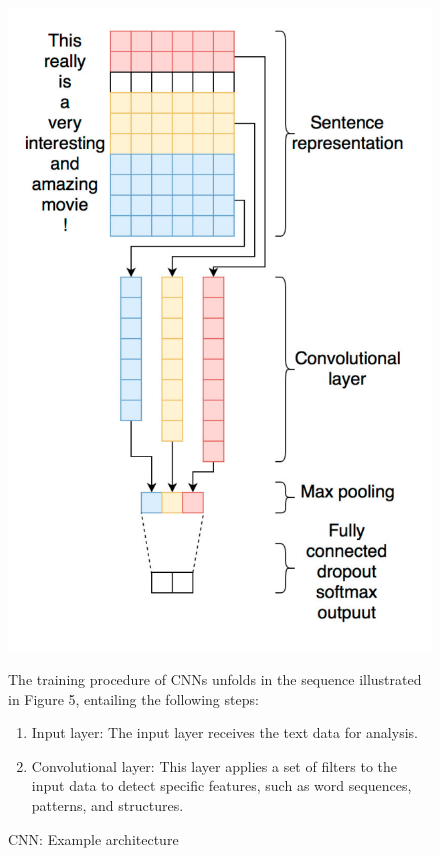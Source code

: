 \documentclass[a4paper]{article}
\begin{document}
\begin{figure}[H]
    \centering
    \begin{minipage}{0.48\textwidth}
      \centering
      \includegraphics[width=\linewidth]{./images/CNN_architecture.png}
      \caption{CNN: Example architecture \cite{ref_cnn1}}
      \label{fig.CNN_1}
    \end{minipage}\hfill
    \begin{minipage}{0.48\textwidth}
        The training procedure of CNNs unfolds in the sequence illustrated in Figure 5, entailing the following steps:
        \begin{enumerate}
            \item Input layer: The input layer receives the text data for analysis.
            \item Convolutional layer: This layer applies a set of filters to the input data to detect specific features, such as word sequences, patterns, and structures.

\end{enumerate}
\end{minipage}
\end{figure}
\end{document}
